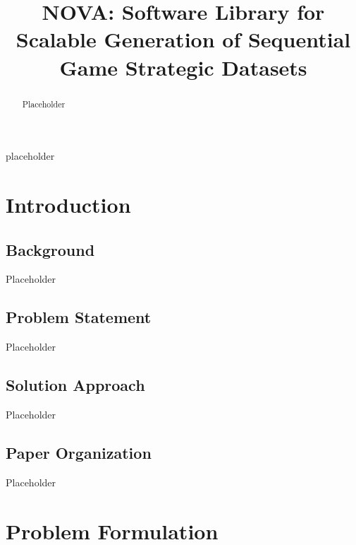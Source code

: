 \documentclass[conference]{IEEEtran}
\begin{document}
\title{NOVA: Software Library for Scalable Generation of Sequential Game Strategic Datasets}

\author{
}

\maketitle

\begin{abstract}
Placeholder
\end{abstract}

\begin{IEEEkeywords}
placeholder
\end{IEEEkeywords}

\section{Introduction}

\subsection{Background}

Placeholder

\subsection{Problem Statement}

Placeholder

\subsection{Solution Approach}

Placeholder

\subsection{Paper Organization}

Placeholder

\section{Problem Formulation}
\end{document}
